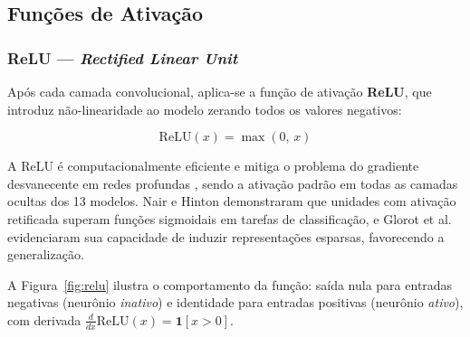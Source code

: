 \documentclass[12pt,a4paper]{article}
\begin{document}
\subsection{Funções de Ativação}

\subsubsection{ReLU --- \textit{Rectified Linear Unit}}

Após cada camada convolucional, aplica-se a função de ativação \textbf{ReLU},
que introduz não-linearidade ao modelo zerando todos os valores negativos:

\begin{equation}
  \text{ReLU}(x) = \max(0,\,x)
  \label{eq:relu}
\end{equation}

A ReLU é computacionalmente eficiente e mitiga o problema do gradiente desvanecente
em redes profundas \cite{glorot2011deep}, sendo a ativação padrão em todas as
camadas ocultas dos 13 modelos. Nair e Hinton \cite{nair2010rectified} demonstraram
que unidades com ativação retificada superam funções sigmoidais em tarefas de
classificação, e Glorot et al.\ \cite{glorot2011deep} evidenciaram sua capacidade
de induzir representações esparsas, favorecendo a generalização.

A Figura~\ref{fig:relu} ilustra o comportamento da função: saída nula para
entradas negativas (neurônio \emph{inativo}) e identidade para entradas positivas
(neurônio \emph{ativo}), com derivada $\frac{d}{dx}\text{ReLU}(x) = \mathbf{1}[x>0]$.
\end{document}
